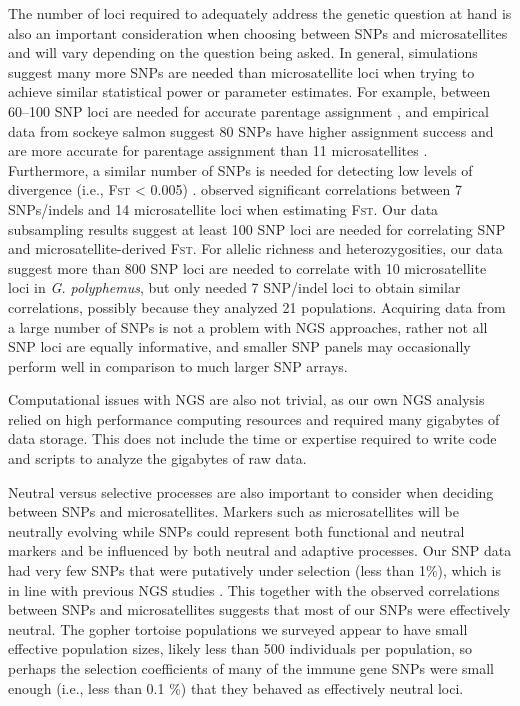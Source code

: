 \documentclass[english]{article}\usepackage[]{graphicx}\usepackage[]{color}
\begin{document}
The number of loci required to adequately address the genetic question at hand is also an important consideration when choosing between SNPs and microsatellites and will vary depending on the question being asked. In general, simulations suggest many more SNPs are needed than microsatellite loci when trying to achieve similar statistical power or parameter estimates. For example, between 60--100 SNP loci are needed for accurate parentage assignment \citep{Anderson_and_Garza_2006}, and empirical data from sockeye salmon suggest 80 SNPs have higher assignment success and are more accurate for parentage assignment than 11 microsatellites \citep{Hauser_et_al_2011}. Furthermore, a similar number of SNPs is needed for detecting low levels of divergence (i.e., \textsc{Fst} < 0.005) \citep{Morin_et_al_2009}. \citet{Ryynanen_et_al_2007} observed significant correlations between 7 SNPs/indels and 14 microsatellite loci when estimating \textsc{Fst}. Our data subsampling results suggest at least 100 SNP loci are needed for correlating SNP and microsatellite-derived \textsc{Fst}. For allelic richness and heterozygosities, our data suggest more than 800 SNP loci are needed to correlate with 10 microsatellite loci in \textit{G. polyphemus}, but \citet{Ryynanen_et_al_2007} only needed 7 SNP/indel loci to obtain similar correlations, possibly because they analyzed 21 populations. Acquiring data from a large number of SNPs is not a problem with NGS approaches, rather not all SNP loci are equally informative, and smaller SNP panels may occasionally perform well in comparison to much larger SNP arrays.

Computational issues with NGS are also not trivial, as our own NGS analysis relied on high performance computing resources and required many gigabytes of data storage. This does not include the time or expertise required to write code and scripts to analyze the gigabytes of raw data.

Neutral versus selective processes are also important to consider when deciding between SNPs and microsatellites. Markers such as microsatellites will be neutrally evolving while SNPs could represent both functional and neutral markers and be influenced by both neutral and adaptive processes. Our SNP data had very few SNPs that were putatively under selection (less than 1\%), which is in line with previous NGS studies \citep[e.g.,][]{Hohenlohe_et_al_2010, Lemay_and_Russello_2015, Blanco-Bercial_and_Bucklin_2016}. This together with the observed correlations between SNPs and microsatellites suggests that most of our SNPs were effectively neutral. The gopher tortoise populations we surveyed appear to have small effective population sizes, likely less than 500 individuals per population, so perhaps the selection coefficients of many of the immune gene SNPs were small enough (i.e., less than 0.1 \%) that they behaved as effectively neutral loci.
\end{document}
